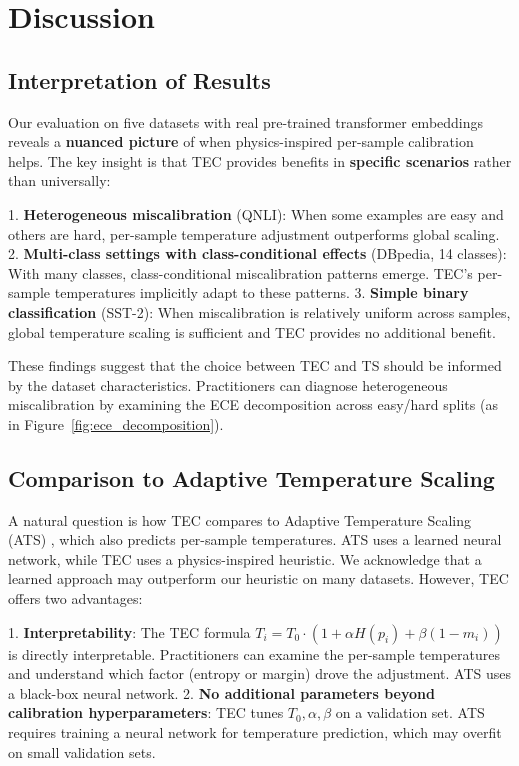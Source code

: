 \documentclass[11pt,letterpaper]{article}
\begin{document}
\section{Discussion}

\subsection{Interpretation of Results}

Our evaluation on five datasets with real pre-trained transformer embeddings reveals a \textbf{nuanced picture} of when physics-inspired per-sample calibration helps. The key insight is that TEC provides benefits in \textbf{specific scenarios} rather than universally:

1. \textbf{Heterogeneous miscalibration} (QNLI): When some examples are easy and others are hard, per-sample temperature adjustment outperforms global scaling.
2. \textbf{Multi-class settings with class-conditional effects} (DBpedia, 14 classes): With many classes, class-conditional miscalibration patterns emerge. TEC's per-sample temperatures implicitly adapt to these patterns.
3. \textbf{Simple binary classification} (SST-2): When miscalibration is relatively uniform across samples, global temperature scaling is sufficient and TEC provides no additional benefit.

These findings suggest that the choice between TEC and TS should be informed by the dataset characteristics. Practitioners can diagnose heterogeneous miscalibration by examining the ECE decomposition across easy/hard splits (as in Figure~\ref{fig:ece_decomposition}).

\subsection{Comparison to Adaptive Temperature Scaling}

A natural question is how TEC compares to Adaptive Temperature Scaling (ATS) \cite{Joy2023}, which also predicts per-sample temperatures. ATS uses a learned neural network, while TEC uses a physics-inspired heuristic. We acknowledge that a learned approach may outperform our heuristic on many datasets. However, TEC offers two advantages:

1. \textbf{Interpretability}: The TEC formula $T_i = T_0 \cdot (1 + \alpha H(p_i) + \beta(1-m_i))$ is directly interpretable. Practitioners can examine the per-sample temperatures and understand which factor (entropy or margin) drove the adjustment. ATS uses a black-box neural network.
2. \textbf{No additional parameters beyond calibration hyperparameters}: TEC tunes $T_0, \alpha, \beta$ on a validation set. ATS requires training a neural network for temperature prediction, which may overfit on small validation sets.
\end{document}
